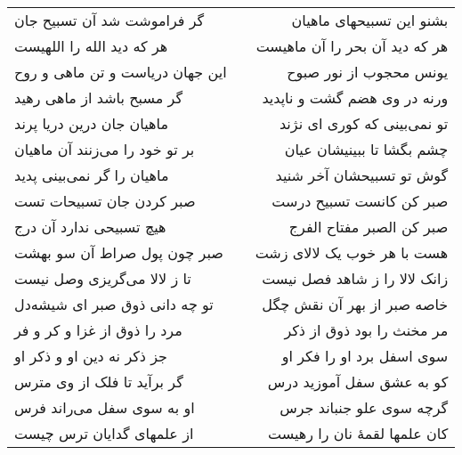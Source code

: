 \begin{center}
\begin{longtable}{l p{0.5cm} r}
گر فراموشت شد آن تسبیح جان
&&
بشنو این تسبیحهای ماهیان
\\
هر که دید الله را اللهیست
&&
هر که دید آن بحر را آن ماهیست
\\
این جهان دریاست و تن ماهی و روح
&&
یونس محجوب از نور صبوح
\\
گر مسبح باشد از ماهی رهید
&&
ورنه در وی هضم گشت و ناپدید
\\
ماهیان جان درین دریا پرند
&&
تو نمی‌بینی که کوری ای نژند
\\
بر تو خود را می‌زنند آن ماهیان
&&
چشم بگشا تا ببینیشان عیان
\\
ماهیان را گر نمی‌بینی پدید
&&
گوش تو تسبیحشان آخر شنید
\\
صبر کردن جان تسبیحات تست
&&
صبر کن کانست تسبیح درست
\\
هیچ تسبیحی ندارد آن درج
&&
صبر کن الصبر مفتاح الفرج
\\
صبر چون پول صراط آن سو بهشت
&&
هست با هر خوب یک لالای زشت
\\
تا ز لالا می‌گریزی وصل نیست
&&
زانک لالا را ز شاهد فصل نیست
\\
تو چه دانی ذوق صبر ای شیشه‌دل
&&
خاصه صبر از بهر آن نقش چگل
\\
مرد را ذوق از غزا و کر و فر
&&
مر مخنث را بود ذوق از ذکر
\\
جز ذکر نه دین او و ذکر او
&&
سوی اسفل برد او را فکر او
\\
گر برآید تا فلک از وی مترس
&&
کو به عشق سفل آموزید درس
\\
او به سوی سفل می‌راند فرس
&&
گرچه سوی علو جنباند جرس
\\
از علمهای گدایان ترس چیست
&&
کان علمها لقمهٔ نان را رهیست
\\
\end{longtable}
\end{center}
